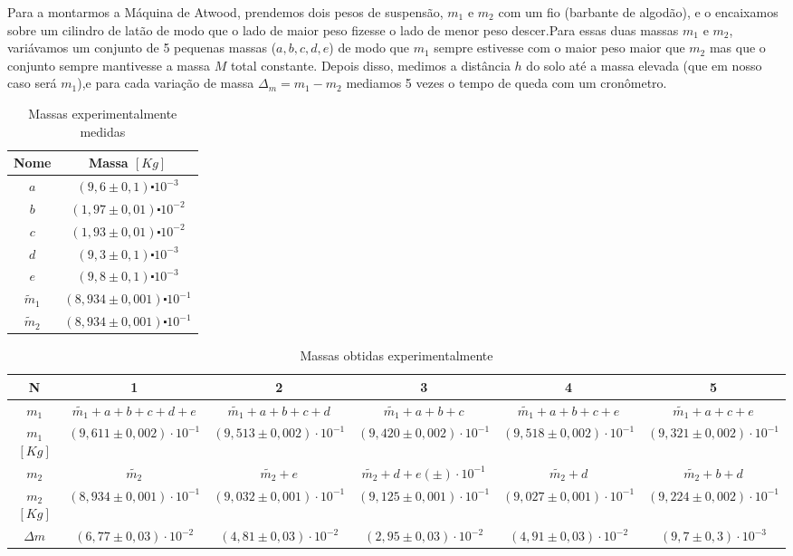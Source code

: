 \documentclass[a4paper]{article}
\providecommand{\tabularnewline}{\\} %
\begin{document}
Para a montarmos a Máquina de Atwood, prendemos dois pesos de suspensão, $m_1$ e $m_2$ com um fio (barbante de algodão), e o encaixamos sobre um cilindro de latão de modo que o lado de maior peso fizesse o lado de menor peso descer.Para essas duas massas $m_1$ e $m_2$, variávamos um conjunto de 5 pequenas massas ($a , b ,  c ,  d ,  e$) de modo que $m_1$ sempre estivesse com o maior peso maior que $m_2$ mas que o conjunto sempre mantivesse a massa $M$ total constante.
Depois disso, medimos a distância $h$ do solo até a massa elevada (que em nosso caso será $m_1$),e para cada variação de massa $\Delta_{m} = {m_1} - {m_2}$ mediamos 5 vezes o tempo de queda com um cronômetro.

\begin{table}[!ht]
	\begin{centering}
	\caption{Massas experimentalmente medidas}
	\par\end{centering}
	\centering{}%
	\begin{tabular}{|c|c|}
	\hline 
	Nome & Massa $[Kg]$\tabularnewline		\hline 
	$a$ & $(9,6\pm0,1)\centerdot10^{-3}$\tabularnewline		\hline 
	$b$ & $(1,97\pm0,01)\centerdot10^{-2}$\tabularnewline	\hline 
	$c$ & $(1,93\pm0,01)\centerdot10^{-2}$\tabularnewline	\hline 
	$d$ & $(9,3\pm0,1)\centerdot10^{-3}$\tabularnewline \hline 
	$e$ & $(9,8\pm0,1)\centerdot10^{-3}$\tabularnewline	\hline 
	$\widetilde{m}_{1}$ & $(8,934\pm0,001)\centerdot10^{-1}$\tabularnewline 	\hline 
	$\widetilde{m}_{2}$ & $(8,934\pm0,001)\centerdot10^{-1}$\tabularnewline 	\hline 
	\end{tabular}
\end{table}

\begin{table}[!ht]
	\begin{adjustwidth}{-2.2cm}{-1cm}
		\begin{centering}
		\caption{Massas obtidas experimentalmente}
		\par\end{centering}
		\centering{}%
		\begin{tabular}{|c|c|c|c|c|c|}
		\hline 
		N & 1 & 2 & 3 & 4 & 5\tabularnewline	\hline 
		$m_{1}$ & $\widetilde{m_{1}}+a+b+c+d+e$ & $\widetilde{m_{1}}+a+b+c+d$ & $\widetilde{m_{1}}+a+b+c$ & $\widetilde{m_{1}}+a+b+c+e$ & $\widetilde{m_{1}}+a+c+e$\tabularnewline		\hline 
		$m_{1}$$[Kg]$ & $(9,611\pm0,002)\cdot10^{-1}$ & $(9,513\pm0,002)\cdot10^{-1}$ & $(9,420\pm0,002)\cdot10^{-1}$ & $(9,518\pm0,002)\cdot10^{-1}$ & $(9,321\pm0,002)\cdot10^{-1}$\tabularnewline	\hline 
		$m_{2}$  & $\widetilde{m_{2}}$ & $\widetilde{m_{2}}+e$ & $\widetilde{m_{2}}+d+e$$(\pm)\cdot10^{-1}$ & $\widetilde{m_{2}}+d$ & $\widetilde{m_{2}}+b+d$\tabularnewline	\hline 
		$m_{2}$$[Kg]$ & $(8,934\pm0,001)\cdot10^{-1}$ & $(9,032\pm0,001)\cdot10^{-1}$ & $(9,125\pm0,001)\cdot10^{-1}$ & $(9,027\pm0,001)\cdot10^{-1}$ & $(9,224\pm0,002)\cdot10^{-1}$\tabularnewline	\hline 
		$\Delta m$ & $(6,77\pm0,03)\cdot10^{-2}$ & $(4,81\pm0,03)\cdot10^{-2}$ & $(2,95\pm0,03)\cdot10^{-2}$ & $(4,91\pm0,03)\cdot10^{-2}$ & $(9,7\pm0,3)\cdot10^{-3}$\tabularnewline	\hline 
		\end{tabular}
	\end{adjustwidth}
\end{table}
\end{document}
